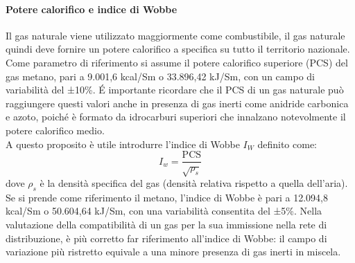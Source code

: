 \paragraph{Potere calorifico e indice di Wobbe}
Il gas naturale viene utilizzato maggiormente come combustibile, il gas naturale quindi deve fornire un potere calorifico a specifica su tutto il territorio nazionale. Come parametro di riferimento si assume il potere calorifico superiore (PCS) del gas metano, pari a 9.001,6 kcal/Sm o 33.896,42 kJ/Sm, con un campo di variabilità del ±10\%. \'E importante ricordare che il PCS di un gas naturale può raggiungere questi valori anche in presenza di gas inerti come anidride carbonica e azoto, poiché è formato da idrocarburi superiori che innalzano notevolmente il potere calorifico medio.\\
A questo proposito è utile introdurre l'indice di Wobbe \(I_W\) definito come:
\[I_w = \dfrac{\textrm{PCS}}{\sqrt{\rho_s}} \label{eq:wobbe} \]
dove \(\rho_s\) è la densità specifica del gas (densità relativa rispetto a quella dell'aria). Se si prende come riferimento il metano, l'indice di Wobbe è pari a 12.094,8 kcal/Sm o 50.604,64 kJ/Sm, con una variabilità consentita del ±5\%. Nella valutazione della compatibilità di un gas per la sua immissione nella rete di distribuzione, è più corretto far riferimento all'indice di Wobbe: il campo di variazione più ristretto equivale a una minore presenza di gas inerti in miscela.

